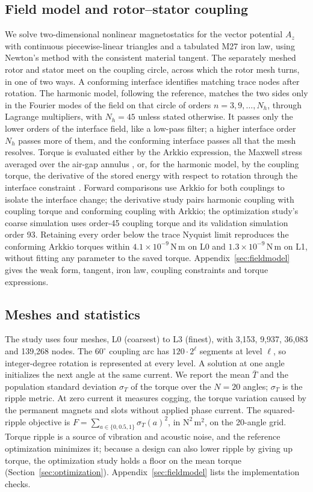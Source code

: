 \documentclass{anvil-paper}
\begin{document}
\subsection{Field model and rotor--stator coupling}
We solve two-dimensional nonlinear magnetostatics for the vector potential
$A_z$ with continuous piecewise-linear triangles and a tabulated M27 iron
law, using Newton's method with the consistent material tangent. The
separately meshed rotor and stator meet on the coupling circle, across
which the rotor mesh turns, in one of two ways. A conforming interface
identifies matching trace nodes after rotation. The harmonic model,
following the reference, matches the two sides only in the Fourier modes
of the field on that circle of orders $n=3,9,\ldots,N_h$, through Lagrange
multipliers, with $N_h=45$ unless stated otherwise. It passes only the
lower orders of the interface field, like a low-pass filter; a higher
interface order $N_h$ passes more of them, and the conforming interface
passes all that the mesh resolves. Torque is evaluated either by the
Arkkio expression, the Maxwell stress averaged over the air-gap annulus
\citep{arkkio1987}, or, for the harmonic model, by the coupling torque, the
derivative of the stored energy with respect to rotation through the
interface constraint \citep{egger2022torque}. Forward comparisons use Arkkio for both couplings
to isolate the interface change; the derivative study pairs harmonic
coupling with coupling torque and conforming coupling with Arkkio; the
optimization study's coarse simulation uses order-45 coupling torque and
its validation simulation order 93. Retaining every order below the trace Nyquist limit reproduces
the conforming Arkkio torques within $4.1\times10^{-9}$\,N\,m on L0 and
$1.3\times10^{-9}$\,N\,m on L1, without fitting any parameter to the saved
torque. Appendix~\ref{sec:fieldmodel} gives the weak form, tangent, iron
law, coupling constraints and torque expressions.

\subsection{Meshes and statistics}
The study uses four meshes, L0 (coarsest) to L3 (finest), with 3,153,
9,937, 36,083 and 139,268 nodes. The $60^\circ$ coupling arc has $120\cdot2^\ell$ segments at level
$\ell$, so integer-degree rotation is represented at every level.
A solution at one angle initializes the next angle at the same current.
We report the mean $\bar T$ and the population standard deviation
$\sigma_T$ of the torque over the $N=20$ angles; $\sigma_T$ is the ripple
metric. At zero current it measures
cogging, the torque variation caused by the permanent magnets and slots
without applied phase current. The squared-ripple objective is
$F=\sum_{a\in\{0,0.5,1\}}\sigma_T(a)^2$, in $\mathrm{N^2\,m^2}$, on the
20-angle grid. Torque ripple is a source of vibration and acoustic noise,
and the reference optimization minimizes it; because a design can also
lower ripple by giving up torque, the optimization study holds a floor on
the mean torque
(Section~\ref{sec:optimization}). Appendix~\ref{sec:fieldmodel} lists the
implementation checks.
\end{document}

